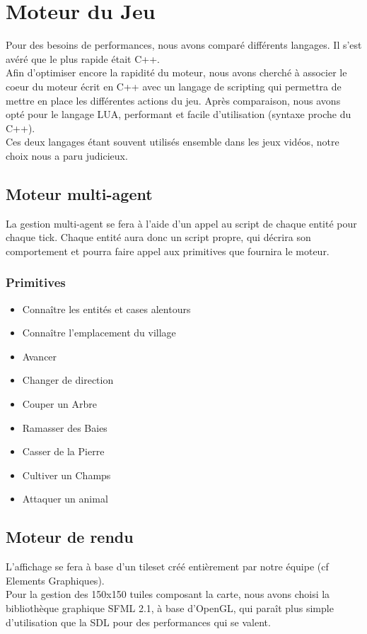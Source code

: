 \documentclass[a4paper]{article}
\begin{document}
    \section{Moteur du Jeu}
      Pour des besoins de performances, nous avons comparé différents langages. Il s'est avéré que le plus rapide était C++.\\
      Afin d'optimiser encore la rapidité du moteur, nous avons cherché à associer le coeur du moteur écrit en C++ avec un langage de scripting qui permettra de mettre en place les différentes actions du jeu. Après comparaison, nous avons opté pour le langage LUA, performant et facile d'utilisation (syntaxe proche du C++).\\
      Ces deux langages étant souvent utilisés ensemble dans les jeux vidéos, notre choix nous a paru judicieux.

      \subsection{Moteur multi-agent}
        La gestion multi-agent se fera à l'aide d'un appel au script de chaque entité pour chaque tick. Chaque entité aura donc un script propre, qui décrira son comportement et pourra faire appel aux primitives que fournira le moteur.

        \subsubsection{Primitives}
          \begin{itemize} \small
            \item Connaître les entités et cases alentours
            \item Connaître l'emplacement du village
            \item Avancer
            \item Changer de direction
            \item Couper un Arbre
            \item Ramasser des Baies
            \item Casser de la Pierre
            \item Cultiver un Champs
            \item Attaquer un animal
          \end{itemize} \normalsize


        \subsection{Moteur de rendu}
          L'affichage se fera à base d'un tileset créé entièrement par notre équipe (cf Elements Graphiques).\\
          Pour la gestion des 150x150 tuiles composant la carte, nous avons choisi la bibliothèque graphique SFML 2.1, à base d'OpenGL, qui paraît plus simple d'utilisation que la SDL pour des performances qui se valent.
\end{document}
